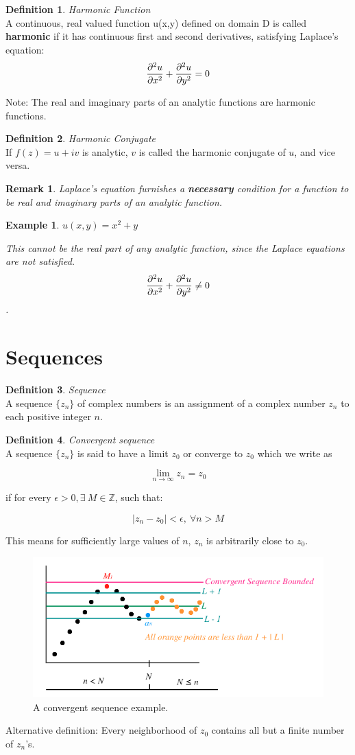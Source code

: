 \documentclass{article}
\newtheorem{ex}{Example}
\newtheorem*{remark}{Remark}
\theoremstyle{definition}
\newtheorem{definition}{Definition}[section]
\newcommand{\Def}[2]{
\begin{shaded*}
\begin{definition}{\textit{#1}}\\#2\end{definition}
\end{shaded*}
}
\begin{document}
\Def{Harmonic Function}{ A continuous, real valued function u(x,y) defined on domain D is called \textbf{harmonic} if it has continuous first and second derivatives, satisfying Laplace's equation:
$$\pdv{^2u}{x^2} + \pdv{^2u}{y^2} = 0$$ 

Note: The real and imaginary parts of an analytic functions are harmonic functions.}

\Def{Harmonic Conjugate}{If $f(z) = u + iv$ is analytic, $v$ is called the harmonic conjugate of $u$, and vice versa.}

\begin{remark}
Laplace's equation furnishes a \textbf{necessary} condition for a function to be real and imaginary parts of an analytic function.
\end{remark}

\begin{ex}
$u(x,y) = x^2+y$

This cannot be the real part of any analytic function, since the Laplace equations are not satisfied. $$\pdv{^2u}{x^2} + \pdv{^2u}{y^2} \neq 0 $$.
\end{ex}

\section{Sequences}
\Def{Sequence}{ A sequence $\{z_n\}$ of complex numbers is an assignment of a complex number $z_n$ to each positive integer $n$.}

\Def{Convergent sequence}{A sequence $\{z_n\}$ is said to have a limit $z_0$ or converge to $z_0$ which we write as 

$$\lim_{n\to\infty} z_n = z_0$$

if for every $\epsilon > 0, \exists\ M \in  \mathbb{Z}$, such that:

$$|z_n - z_0| < \epsilon,\ \forall n > M$$

This means for sufficiently large values of $n$, $z_n$ is arbitrarily close to $z_0$.

\begin{figure}[H]
	\centering
	\includegraphics[width=0.7\linewidth]{convseq}
	\caption{A convergent sequence example. }
	\label{fig:convseq}
\end{figure}

Alternative definition: Every neighborhood of $z_0$ contains all but a finite number of $z_n$'s.
}
\end{document}
